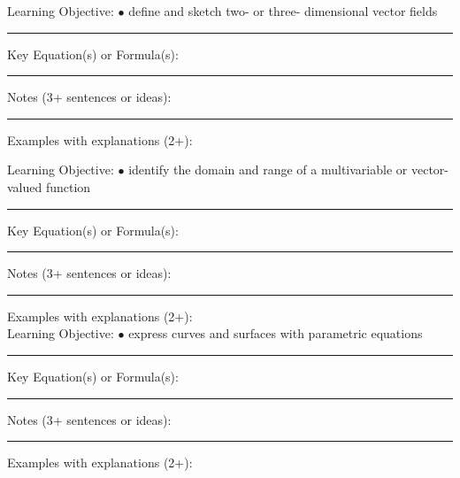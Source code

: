 \documentclass{article}
\theoremstyle{plain}
\theoremstyle{definition}
\theoremstyle{remark}
\begin{document}
\vskip-2pt
\noindent \large Learning Objective:
\normalsize
\vskip0.15in
\indent $\bullet$ define and sketch two- or three- dimensional vector fields
\vskip0.15in
\hrule
\vspace{0.1in}
\large \noindent Key Equation(s) or Formula(s):
\normalsize

\vspace{1in}
\hrule
\vspace{0.1in}
\large \noindent Notes (3+ sentences or ideas):
\normalsize
\vspace{1.75in}
\hrule
\vspace{0.1in}

\large \noindent Examples with explanations (2+):

\newpage
\noindent \large Learning Objective:
\normalsize
\vskip0.15in
\indent $\bullet$ identify the domain and range of a multivariable or vector-valued function
\vskip0.15in
\hrule
\vspace{0.1in}
\large \noindent Key Equation(s) or Formula(s):
\normalsize

\vspace{1in}
\hrule
\vspace{0.1in}
\large \noindent Notes (3+ sentences or ideas):
\normalsize
\vspace{1.75in}
\hrule
\vspace{0.1in}

\large \noindent Examples with explanations (2+):\\

\newpage
\noindent \large Learning Objective:
\normalsize
\vskip0.15in
\indent $\bullet$ express curves and surfaces with parametric equations
\vskip0.15in
\hrule
\vspace{0.1in}
\large \noindent Key Equation(s) or Formula(s):
\normalsize

\vspace{1in}
\hrule
\vspace{0.1in}
\large \noindent Notes (3+ sentences or ideas):
\normalsize
\vspace{1.75in}
\hrule
\vspace{0.1in}

\large \noindent Examples with explanations (2+):\\
\end{document}
